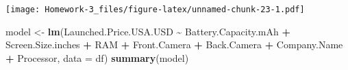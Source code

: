 \documentclass[
]{article}
\newenvironment{Shaded}{\begin{snugshade}}{\end{snugshade}}
\newcommand{\AttributeTok}[1]{\textcolor[rgb]{0.13,0.29,0.53}{#1}}
\newcommand{\FunctionTok}[1]{\textcolor[rgb]{0.13,0.29,0.53}{\textbf{#1}}}
\newcommand{\NormalTok}[1]{#1}
\newcommand{\OtherTok}[1]{\textcolor[rgb]{0.56,0.35,0.01}{#1}}
\newcommand{\SpecialCharTok}[1]{\textcolor[rgb]{0.81,0.36,0.00}{\textbf{#1}}}
\begin{document}
\texttt{[image: Homework-3\_files/figure-latex/unnamed-chunk-23-1.pdf]}

\begin{Shaded}
\begin{Highlighting}[]
\NormalTok{model }\OtherTok{\textless{}{-}} \FunctionTok{lm}\NormalTok{(Launched.Price.USA.USD }\SpecialCharTok{\textasciitilde{}}\NormalTok{ Battery.Capacity.mAh }\SpecialCharTok{+}\NormalTok{ Screen.Size.inches }\SpecialCharTok{+}\NormalTok{ RAM }\SpecialCharTok{+}\NormalTok{ Front.Camera }\SpecialCharTok{+}\NormalTok{ Back.Camera }\SpecialCharTok{+}\NormalTok{ Company.Name }\SpecialCharTok{+}\NormalTok{ Processor, }\AttributeTok{data =}\NormalTok{ df)}
\FunctionTok{summary}\NormalTok{(model)}
\end{Highlighting}
\end{Shaded}
\end{document}
